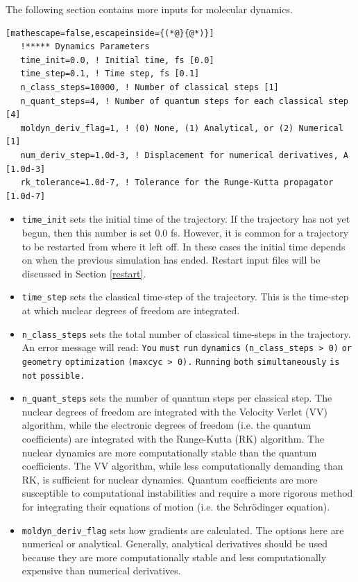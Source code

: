 \documentclass[letterpaper,12pt,titlepage]{article}
\begin{document}
The following section contains more inputs for molecular dynamics.
\begin{lstlisting}[mathescape=false,escapeinside={(*@}{@*)}]
   !***** Dynamics Parameters
   time_init=0.0, ! Initial time, fs [0.0]
   time_step=0.1, ! Time step, fs [0.1]
   n_class_steps=10000, ! Number of classical steps [1]
   n_quant_steps=4, ! Number of quantum steps for each classical step [4]
   moldyn_deriv_flag=1, ! (0) None, (1) Analytical, or (2) Numerical [1]
   num_deriv_step=1.0d-3, ! Displacement for numerical derivatives, A [1.0d-3]
   rk_tolerance=1.0d-7, ! Tolerance for the Runge-Kutta propagator [1.0d-7]
\end{lstlisting}
\begin{itemize}
\item \verb+time_init+ sets the initial time of the trajectory.  If the trajectory has not yet begun, then this number is set 0.0 fs.  However, it is common for a trajectory to be restarted from where it left off.  In these cases the initial time depends on when the previous simulation has ended.  Restart input files will be discussed in Section \ref{restart}.
\item \verb+time_step+ sets the classical time-step of the trajectory.  This is the time-step at which nuclear degrees of freedom are integrated.
\item \verb+n_class_steps+ sets the total number of classical time-steps in the trajectory.  An error message will read: \verb+You+ \verb+must+ \verb+run+ \verb+dynamics+ \verb+(n_class_steps > 0)+ \verb+or+ \verb+geometry+ \verb+optimization+ \verb+(maxcyc > 0).+ \verb+Running+ \verb+both+ \verb+simultaneously+ \verb+is+ \verb+not+ \verb+possible.+
\item \verb+n_quant_steps+ sets the number of quantum steps per classical step.  The nuclear degrees of freedom are integrated with the Velocity Verlet (VV) algorithm, while the electronic degrees of freedom (i.e. the quantum coefficients) are integrated with the Runge-Kutta (RK) algorithm.  The nuclear dynamics are more computationally stable than the quantum coefficients.  The VV algorithm, while less computationally demanding than RK, is sufficient for nuclear dynamics.  Quantum coefficients are more susceptible to computational instabilities and require a more rigorous method for integrating their equations of motion (i.e. the Schr\"{o}dinger equation).
\item \verb+moldyn_deriv_flag+ sets how gradients are calculated.  The options here are numerical or analytical.  Generally, analytical derivatives should be used because they are more computationally stable and less computationally expensive than numerical derivatives.

\end{itemize}
\end{document}
